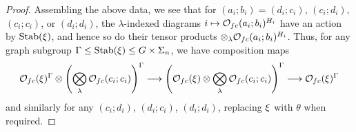 \documentclass[a4paper,10pt
,draft
]{article}%
\renewcommand{\1}{\ensuremath{\mathbb{id}}}
\begin{document}
\begin{proof}
      Assembling the above data, 
      we see that for $(a_i;b_i) = (d_i;c_i)$, $(c_i;d_i)$, $(c_i;c_i)$, or $(d_i;d_i)$,
      the $\lambda$-indexed diagrams $i \mapsto \mathcal{O}_{f c}(a_i;b_i)^{H_i}$
      have an action by $\mathrm{Stab}(\xi)$,
      and hence so do their tensor products $\otimes_\lambda \mathcal{O}_{f c}(a_i;b_i)^{H_i}$.
      Thus, for any graph subgroup $\Gamma \leq \mathrm{Stab}(\xi) \leq G \times \Sigma_n$,
      we have composition maps
      \begin{equation}
            \mathcal{O}_{f c}(\xi)^{\Gamma} \otimes \left(
                  \bigotimes\limits_\lambda \mathcal{O}_{f c}(c_i;c_i)
            \right)^{\Gamma}
            \longrightarrow
            \left(
                  \mathcal{O}_{f c}(\xi) \otimes \bigotimes\limits_\lambda \mathcal{O}_{f c}(c_i;c_i)
            \right)^\Gamma
            \longrightarrow
            \mathcal{O}_{f c}(\xi)^\Gamma
      \end{equation}
      and similarly for any $(c_i;d_i)$, $(d_i;c_i)$, $(d_i;d_i)$,
      replacing $\xi$ with $\theta$ when required.
      

\end{proof}
\end{document}
